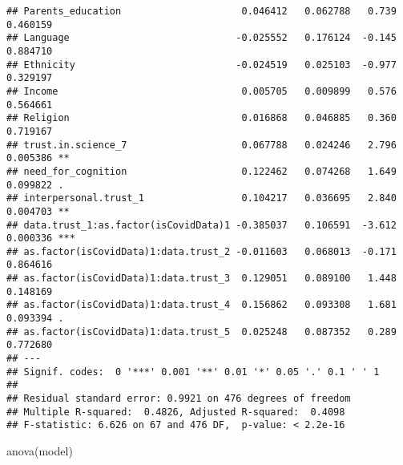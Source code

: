 \documentclass[
]{article}
\newenvironment{Shaded}{\begin{snugshade}}{\end{snugshade}}
\newcommand{\FunctionTok}[1]{\textcolor[rgb]{0.00,0.00,0.00}{#1}}
\newcommand{\NormalTok}[1]{#1}
\begin{document}
\begin{verbatim}
## Parents_education                     0.046412   0.062788   0.739 0.460159    
## Language                             -0.025552   0.176124  -0.145 0.884710    
## Ethnicity                            -0.024519   0.025103  -0.977 0.329197    
## Income                                0.005705   0.009899   0.576 0.564661    
## Religion                              0.016868   0.046885   0.360 0.719167    
## trust.in.science_7                    0.067788   0.024246   2.796 0.005386 ** 
## need_for_cognition                    0.122462   0.074268   1.649 0.099822 .  
## interpersonal.trust_1                 0.104217   0.036695   2.840 0.004703 ** 
## data.trust_1:as.factor(isCovidData)1 -0.385037   0.106591  -3.612 0.000336 ***
## as.factor(isCovidData)1:data.trust_2 -0.011603   0.068013  -0.171 0.864616    
## as.factor(isCovidData)1:data.trust_3  0.129051   0.089100   1.448 0.148169    
## as.factor(isCovidData)1:data.trust_4  0.156862   0.093308   1.681 0.093394 .  
## as.factor(isCovidData)1:data.trust_5  0.025248   0.087352   0.289 0.772680    
## ---
## Signif. codes:  0 '***' 0.001 '**' 0.01 '*' 0.05 '.' 0.1 ' ' 1
## 
## Residual standard error: 0.9921 on 476 degrees of freedom
## Multiple R-squared:  0.4826, Adjusted R-squared:  0.4098 
## F-statistic: 6.626 on 67 and 476 DF,  p-value: < 2.2e-16
\end{verbatim}

\begin{Shaded}
\begin{Highlighting}[]
\FunctionTok{anova}\NormalTok{(model)}
\end{Highlighting}
\end{Shaded}
\end{document}
